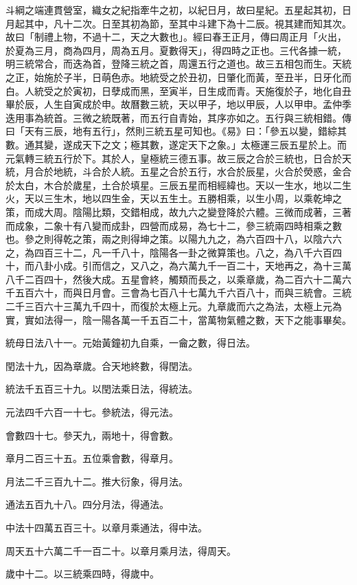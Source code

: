 \begin{pinyinscope}
斗綱之端連貫營室，織女之紀指牽牛之初，以紀日月，故曰星紀。五星起其初，日月起其中，凡十二次。日至其初為節，至其中斗建下為十二辰。視其建而知其次。故曰「制禮上物，不過十二，天之大數也」。經曰春王正月，傳曰周正月「火出，於夏為三月，商為四月，周為五月。夏數得天」，得四時之正也。三代各據一統，明三統常合，而迭為首，登降三統之首，周還五行之道也。故三五相包而生。天統之正，始施於子半，日萌色赤。地統受之於丑初，日肇化而黃，至丑半，日牙化而白。人統受之於寅初，日孽成而黑，至寅半，日生成而青。天施復於子，地化自丑畢於辰，人生自寅成於申。故曆數三統，天以甲子，地以甲辰，人以甲申。孟仲季迭用事為統首。三微之統既著，而五行自青始，其序亦如之。五行與三統相錯。傳曰「天有三辰，地有五行」，然則三統五星可知也。《易》曰：「參五以變，錯綜其數。通其變，遂成天下之文；極其數，遂定天下之象。」太極運三辰五星於上。而元氣轉三統五行於下。其於人，皇極統三德五事。故三辰之合於三統也，日合於天統，月合於地統，斗合於人統。五星之合於五行，水合於辰星，火合於熒惑，金合於太白，木合於歲星，土合於填星。三辰五星而相經緯也。天以一生水，地以二生火，天以三生木，地以四生金，天以五生土。五勝相乘，以生小周，以乘乾坤之策，而成大周。陰陽比類，交錯相成，故九六之變登降於六體。三微而成著，三著而成象，二象十有八變而成卦，四營而成易，為七十二，參三統兩四時相乘之數也。參之則得乾之策，兩之則得坤之策。以陽九九之，為六百四十八，以陰六六之，為四百三十二，凡一千八十，陰陽各一卦之微算策也。八之，為八千六百四十，而八卦小成。引而信之，又八之，為六萬九千一百二十，天地再之，為十三萬八千二百四十，然後大成。五星會終，觸類而長之，以乘章歲，為二百六十二萬六千五百六十，而與日月會。三會為七百八十七萬九千六百八十，而與三統會。三統二千三百六十三萬九千四十，而復於太極上元。九章歲而六之為法，太極上元為實，實如法得一，陰一陽各萬一千五百二十，當萬物氣體之數，天下之能事畢矣。

統母日法八十一。元始黃鐘初九自乘，一龠之數，得日法。

閏法十九，因為章歲。合天地終數，得閏法。

統法千五百三十九。以閏法乘日法，得統法。

元法四千六百一十七。參統法，得元法。

會數四十七。參天九，兩地十，得會數。

章月二百三十五。五位乘會數，得章月。

月法二千三百九十二。推大衍象，得月法。

通法五百九十八。四分月法，得通法。

中法十四萬五百三十。以章月乘通法，得中法。

周天五十六萬二千一百二十。以章月乘月法，得周天。

歲中十二。以三統乘四時，得歲中。


\end{pinyinscope}
